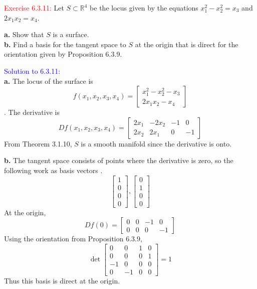 \documentclass[12pt]{article}
\begin{document}
{\textcolor{red}{Exercise 6.3.11:}
Let $S \subset \mathbb{R}^4$
be the locus given by the equations
$x_1^2-x_2^2 =x_3$
and $2x_1x_2 = x_4$.
\smallskip

\textbf{a.}
Show that $S$ is a surface.\medskip \\
\textbf{b.}
Find a basis for the tangent space to $S$ at the origin that is direct for the orientation given by Proposition 6.3.9.
\smallskip

\textcolor{blue}{Solution to 6.3.11:} \\
\textbf{a.}
The locus of the surface is
\[
    f(x_1, x_2, x_3, x_4) = \begin{bmatrix}
        x_1^2-x_2^2-x_3 \\ 2x_1x_2 - x_4
    \end{bmatrix}
\].
The derivative is 
\[
    Df(x_1, x_2, x_3, x_4) =
    \begin{bmatrix}
        2x_1 & -2x_2 & -1 & 0 \\
        2x_2 & 2x_1 & 0 & -1
    \end{bmatrix}
\]
From Theorem 3.1.10, $S$ is a smooth manifold since the derivative is onto.

\textbf{b.}
The tangent space consists of points where the derivative is zero,
so the following work as basis vectors .
\[
    \begin{bmatrix}
        1 \\ 0 \\ 0 \\ 0
    \end{bmatrix},
    \begin{bmatrix}
        0 \\ 1 \\ 0 \\ 0
    \end{bmatrix}
\]
At the origin,
\[
    Df(0) =
    \begin{bmatrix}
        0 & 0 & -1 & 0 \\
        0 & 0 & 0 & -1
    \end{bmatrix}
\]
Using the orientation from Proposition 6.3.9,
\[
    \det 
    \begin{bmatrix}
        0 & 0 & 1 & 0 \\
        0 & 0 & 0 & 1 \\
        -1 & 0 & 0 & 0 \\
        0 & -1 & 0 & 0
    \end{bmatrix}
    = 1
\]
Thus this basis is direct at the origin.

\newpage

}
\end{document}
